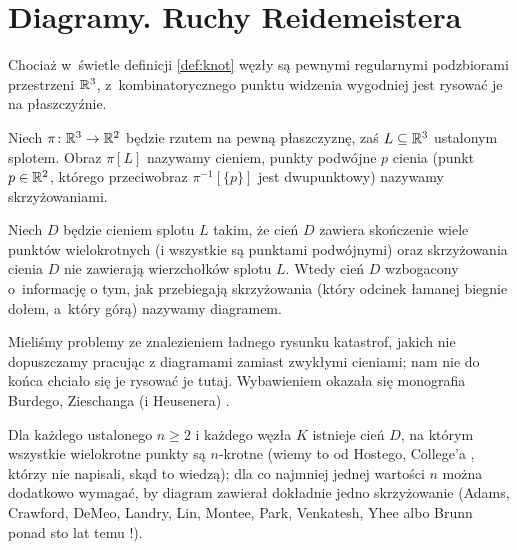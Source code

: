 
\section{Diagramy. Ruchy Reidemeistera}

Chociaż w~świetle definicji \ref{def:knot} węzły są pewnymi regularnymi podzbiorami przestrzeni $\mathbb R^3$, z~kombinatorycznego punktu widzenia wygodniej jest rysować je na płaszczyźnie.

\begin{definition}
%
%  
\label{def:crossing}%
    Niech $\pi \colon \mathbb R^3 \to \mathbb R^2$ będzie rzutem na pewną płaszczyznę, zaś $L \subseteq \mathbb R^3$ ustalonym splotem.
    Obraz $\pi[L]$ nazywamy cieniem, punkty podwójne $p$ cienia (punkt $p \in \mathbb R^2$, którego przeciwobraz $\pi^{-1}[\{p\}]$ jest dwupunktowy) nazywamy skrzyżowaniami.
\end{definition}

\begin{definition}[diagram]
%
    Niech $D$ będzie cieniem splotu $L$ takim, że cień $D$ zawiera skończenie wiele punktów wielokrotnych (i wszystkie są punktami podwójnymi) oraz skrzyżowania cienia $D$ nie zawierają wierzchołków splotu $L$.
    Wtedy cień $D$ wzbogacony o~informację o tym, jak przebiegają skrzyżowania (który odcinek łamanej biegnie dołem, a~który górą) nazywamy diagramem.
\end{definition}

Mieliśmy problemy ze znalezieniem ładnego rysunku katastrof, jakich nie dopuszczamy pracując z diagramami zamiast zwykłymi cieniami; nam nie do końca chciało się je rysować je tutaj.
Wybawieniem okazała się monografia Burdego, Zieschanga (i Heusenera) \cite[s. 9]{burde2014}.

Dla każdego ustalonego $n \ge 2$ i każdego węzła $K$ istnieje cień $D$, na którym wszystkie wielokrotne punkty są $n$-krotne (wiemy to od Hostego, College'a \cite[s. 11]{adams2021}, którzy nie napisali, skąd to wiedzą);
%
%
dla co najmniej jednej wartości $n$ można dodatkowo wymagać, by diagram zawierał dokładnie jedno skrzyżowanie (Adams, Crawford, DeMeo, Landry, Lin, Montee, Park, Venkatesh, Yhee \cite{venkatesh2015} albo Brunn ponad sto lat temu \cite[s. 28]{adams2021}!).
%
%
%
%
%
%
%
%


